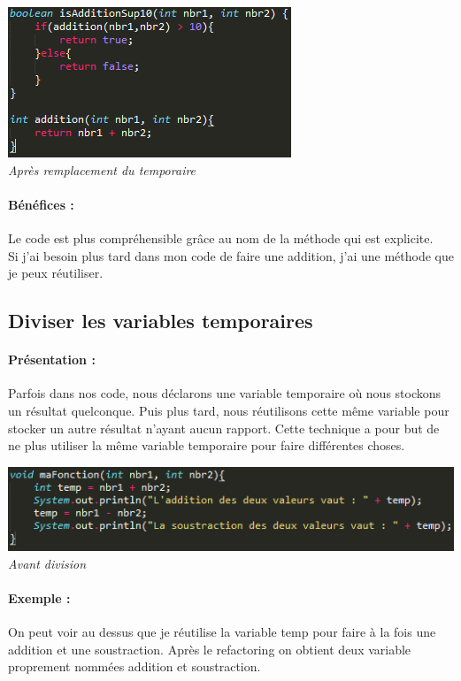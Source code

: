 \documentclass[a4paper,twoside,12pt,openright]{report}
\begin{document}
\begin{center}
\includegraphics[scale=1]{Image/Remplacement_Temp_Methode2.png}\\
\itshape{Après remplacement du temporaire}
\end{center}

\paragraph{Bénéfices :}
Le code est plus compréhensible grâce au nom de la méthode qui est explicite.\\
Si j'ai besoin plus tard dans mon code de faire une addition, j'ai une méthode que je peux réutiliser.

\subsection{Diviser les variables temporaires}
\paragraph{Présentation :}
Parfois dans nos code, nous déclarons une variable temporaire où nous stockons un résultat quelconque. Puis plus tard, nous réutilisons cette même variable pour stocker un autre résultat n'ayant aucun rapport.
Cette technique a pour but de ne plus utiliser la même variable temporaire pour faire différentes choses.

\begin{center}
\includegraphics[scale=1]{Image/Diviser_Temp.png}\\
\itshape{Avant division}
\end{center}

\paragraph{Exemple :}
On peut voir au dessus que je réutilise la variable temp pour faire à la fois une addition et une soustraction. Après le refactoring on obtient deux variable proprement nommées addition et soustraction.
\end{document}
